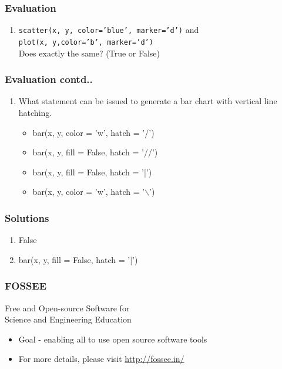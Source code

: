 \documentclass[17pt,compress]{beamer}
\newcounter{saveenumi}
\newcommand{\seti}{\setcounter{saveenumi}{\value{enumi}}}
\newcommand{\conti}{\setcounter{enumi}{\value{saveenumi}}}
\begin{document}
\begin{frame}
\frametitle{Evaluation}
\label{sec-21.1}
\begin{enumerate}
\item \texttt{scatter(x, y, color='blue', marker='d')} \pause
and \\
\texttt{plot(x, y,color='b', marker='d')}\pause \\ Does exactly the same? (True or False)
\seti
\end{enumerate}
\end{frame}
\begin{frame}
\frametitle{Evaluation contd..}
\label{sec-21.2}
\begin{enumerate}
\conti
\item What statement can be issued to generate a bar chart with vertical
line hatching.\pause
\begin{itemize}
\item bar(x, y, color = 'w', hatch = '/')
\item bar(x, y, fill = False, hatch = '//')
\item bar(x, y, fill = False, hatch = '|')
\item bar(x, y, color = 'w', hatch = '$\backslash$')
\end{itemize}
\end{enumerate}
\end{frame}
\begin{frame}
\frametitle{Solutions}
\label{sec-22}
\begin{enumerate}
\item False\pause
\item bar(x, y, fill = False, hatch = '|')
\end{enumerate}
\end{frame}
\begin{frame}
\frametitle{FOSSEE}
{\color{blue}Free and Open-source Software for \\Science and Engineering Education} \\
\begin{itemize}
\item Goal - enabling all to use open source software tools
\item For more details, please visit {\color{blue}\url{http://fossee.in/}}
\end{itemize}
\end{frame}
\end{document}
